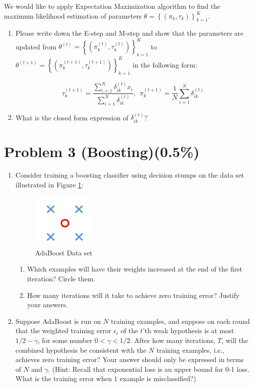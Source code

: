 \documentclass{article}
\begin{document}
We would like to apply Expectation Maximization algorithm to find the
maximum likelihood estimation of parameters
\(\theta = \left\{ (\pi_{k},\tau_{k}) \right\}_{k = 1}^{K}\).
\begin{enumerate}[label=(\alph*)]
\item
   Please write down the E-step and M-step and show
  that the parameters are updated from
  \(\theta^{(t)} = \left\{ (\pi_{k}^{(t)},\tau_{k}^{(t)}) \right\}_{k = 1}^{K}\)
  to
  \(\theta^{(t + 1)} = \left\{ (\pi_{k}^{(t + 1)},\tau_{k}^{(t + 1)}) \right\}_{k = 1}^{K}\)
  in the following form:

\[\tau_{k}^{(t + 1)} = \frac{\sum_{i = 1}^{N}{\delta_{ik}^{(t)}x_{i}}}{\sum_{i = 1}^{N}\delta_{ik}^{(t)}},\ \ \pi_{k}^{(t + 1)} = \frac{1}{N}\sum_{i = 1}^{N}\delta_{ik}^{(t)}\]

\item
  What is the closed form expression of
  \(\delta_{ik}^{(t)}\)?
\end{enumerate}


\section*{Problem 3 (Boosting)(0.5\%)}
\begin{enumerate}
\item  Consider training a boosting classifier using decision stumps on the data set illustrated in Figure \ref{fig:adaboost_toy_example}:
	\begin{figure}[H]
	\centerline{\includegraphics[width = 2 cm, height = 2 cm]{adaboost_toy_example.png}}
	\caption{
	AdaBoost Data set
	}
	\label{fig:adaboost_toy_example}
	\end{figure} 
	\begin{enumerate}
	\item Which examples will have their weights increased at the end of the first iteration? Circle them.
	\item  How many iterations will it take to achieve zero training error? Justify your answers.
	\end{enumerate}
\item  Suppose AdaBoost is run on $N$ training examples, and suppose on each round that the weighted training error $\epsilon_t$ of the $t$'th weak hypothesis is at most $1/2-\gamma$, for some number $0 < \gamma < 1/2$. After how many iterations, $T$, will the combined hypothesis be consistent with the $N$ training examples, i.e., achieves zero training error? Your answer should only be expressed in terms of $N$ and $\gamma$. (Hint: Recall that exponential loss is an upper bound for 0-1 loss. What is the training error when $1$ example is misclassified?)
\end{enumerate}
\end{document}
